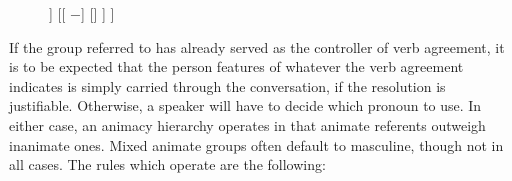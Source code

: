 \begin{figure}[h]
\ex\label{ex:gramgend2}
\begin{forest}
[{[\Gend{}]}
	[{[\Anim{} $+$]}
		[\M]
		[\F]
		[\N]
	]
	[{[\Anim{} $-$]}
		[\Inan]
	]
]
\end{forest}
\xe
\end{figure}

If the group referred to has already served as the controller of verb
agreement, it is to be expected that the person features of whatever the verb
agreement indicates is simply carried through the conversation, if the
resolution is justifiable. Otherwise, a speaker will have to decide which
pronoun to use. In either case, an animacy hierarchy operates in that animate
referents outweigh inanimate ones. Mixed animate groups often default to
masculine, though not in all cases. The rules which operate are the following:

